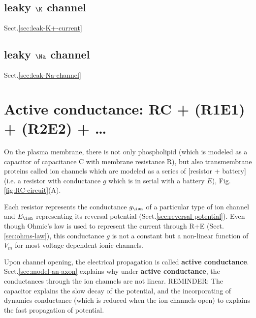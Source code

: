 \subsection{leaky $\K$ channel}

Sect.\ref{sec:leak-K+-current}

\subsection{leaky $\Na$ channel}

Sect.\ref{sec:leak-Na-channel}


\section{Active conductance: RC + (R1E1) + (R2E2) + \ldots}
\label{sec:ionchannels-resistors}

On the plasma membrane, there is not only phospholipid (which is modeled as a
capacitor of capacitance C with membrane resistance R), but also transmembrane
proteins called ion channels which are modeled as a series of [resistor +
battery] (i.e. a resistor with conductance $g$ which is in serial with a battery
$E$), Fig.\ref{fig:RC-circuit}(A).

Each resistor represents the conductance $g_\ion$ of a particular type of ion
channel and $E_\ion$ representing its reversal potential
(Sect.\ref{sec:reversal-potential}).
Even though Ohmic's law is used to represent the current through R+E
(Sect.\ref{sec:ohms-law}), this conductance $g$ is not a constant but a
non-linear function of $V_m$ for most voltage-dependent ionic channels.


Upon channel opening, the electrical propagation is called {\bf active
conductance}. Sect.\ref{sec:model-an-axon} explains why under {\bf active
conductance}, the conductances through the ion channels are not linear.
REMINDER: The capacitor explains the slow decay of the potential, and the
incorporating of dynamics conductance (which is reduced when the ion channels
open) to explains the fast propagation of potential.


